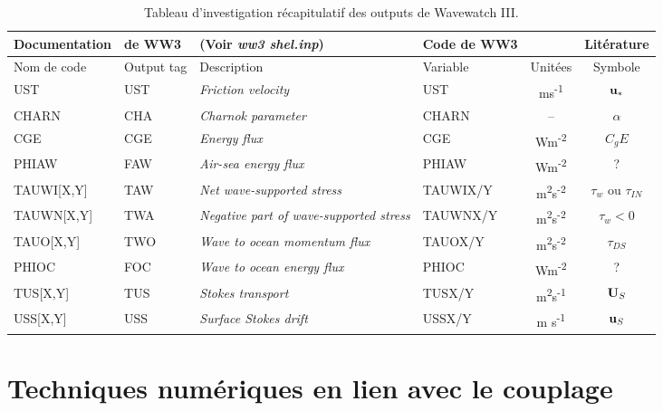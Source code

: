 \documentclass[10pt]{report}
\numberwithin{equation}{section}
\newcommand{\uu}{\vb{u}}
\newcommand{\ust}{\vb{u}_{\ast}}
\begin{document}
\begin{table}[htbp]
\caption{\label{tab:orgba5f895}Tableau d'investigation récapitulatif des outputs de Wavewatch III.}
\centering
\begin{tabular}{lll|lc|c}
\hline
\hline
\textbf{Documentation} & \textbf{de WW3} & (Voir \emph{ww3 shel.inp}) & \textbf{Code de WW3} &  & \textbf{Litérature}\\[0pt]
\hline
Nom de code & Output tag & Description & Variable & Unitées & Symbole\\[0pt]
\hline
UST & UST & \emph{Friction velocity} & UST & ms\textsuperscript{-1} & \(\ust\)\\[0pt]
CHARN & CHA & \emph{Charnok parameter} & CHARN & -- & \(\alpha\)\\[0pt]
CGE & CGE & \emph{Energy flux} & CGE & Wm\textsuperscript{-2} & \(C_gE\)\\[0pt]
PHIAW & FAW & \emph{Air-sea energy flux} & PHIAW & Wm\textsuperscript{-2} & ?\\[0pt]
TAUWI[X,Y] & TAW & \emph{Net wave-supported stress} & TAUWIX/Y & m\textsuperscript{2}s\textsuperscript{-2} & \(\tau_w\)  ou \(\tau_{IN}\)\\[0pt]
TAUWN[X,Y] & TWA & \emph{Negative part of wave-supported stress} & TAUWNX/Y & m\textsuperscript{2}s\textsuperscript{-2} & \(\tau_w<0\)\\[0pt]
\hline
TAUO[X,Y] & TWO & \emph{Wave to ocean momentum flux} & TAUOX/Y & m\textsuperscript{2}s\textsuperscript{-2} & \(\tau_{DS}\)\\[0pt]
PHIOC & FOC & \emph{Wave to ocean energy flux} & PHIOC & Wm\textsuperscript{-2} & ?\\[0pt]
TUS[X,Y] & TUS & \emph{Stokes transport} & TUSX/Y & m\textsuperscript{2}s\textsuperscript{-1} & \(\vb{U}_S\)\\[0pt]
USS[X,Y] & USS & \emph{Surface Stokes drift} & USSX/Y & m s\textsuperscript{-1} & \(\uu_S\)\\[0pt]
\hline
\hline
\end{tabular}
\end{table}



\chapter{Techniques numériques en lien avec le couplage}
\label{sec:orgb9fe97b}
\end{document}
